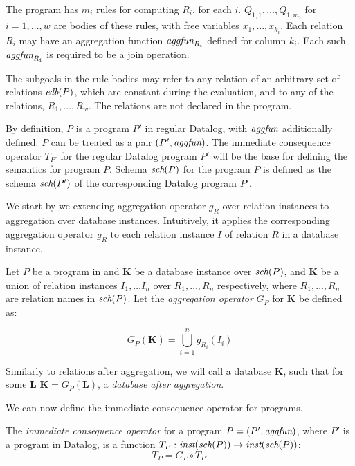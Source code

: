 The program has $m_i$ rules for computing $R_i$, for each $i$. $Q_{1, 1}, \dots, Q_{1, m_i}$ for $i = 1, \dots, w$ are bodies of these rules, with free variables $x_1, \dots, x_{k_i}$. Each relation $R_i$ may have an aggregation function $\textit{aggfun}_{R_i}$ defined for column $k_i$. Each such $\textit{aggfun}_{R_i}$ is required to be a join operation.

The subgoals in the rule bodies may refer to any relation of an arbitrary set of \edb relations $\textit{edb}(P)$, which are constant during the evaluation, and to any of the \idb relations, $R_1, \dots, R_w$. The \edb relations are not declared in the program.

By definition, $P$ is a program $P'$ in regular Datalog, with  $\textit{aggfun}$ additionally defined. $P$ can be treated as a pair $(P', \textit{aggfun})$. The immediate consequence operator $T_{P'}$ for the regular Datalog program $P'$ will be the base for defining the semantics for \datalogra program $P$. Schema $\textit{sch}(P)$ for the \datalogra program $P$ is defined as the schema $\textit{sch}(P')$ of the corresponding Datalog program $P'$.

We start by we extending aggregation operator $g_R$ over relation instances to aggregation over database instances. Intuitively, it applies the corresponding aggregation operator $g_R$ to each relation instance $I$ of relation $R$ in a database instance.

\begin{defn}
Let $P$ be a program in \datalogra and $\textbf{K}$ be a database instance over $\textit{sch}(P)$, and $\textbf{K}$ be a union of relation instances $I_1, \dots I_n$ over $R_1, \dots, R_n$ respectively, where $R_1, \dots, R_n$ are relation names in $\textit{sch}(P)$.
Let the \emph{aggregation operator} $G_P$ for $\textbf{K}$ be defined as:

$$G_P(\textbf{K}) = \bigcup_{i = 1}^n g_{R_i}(I_i)$$

\end{defn}
Similarly to relations after aggregation, we will call a database $\textbf{K}$, such that for some $\textbf{L}$ $\textbf{K} = G_P(\textbf{L})$, a \emph{database after aggregation}.

We can now define the immediate consequence operator for \datalogra programs.

\begin{defn}
The \emph{immediate consequence operator} for a \datalogra program $P = (P', \textit{aggfun})$, where $P'$ is a program in Datalog, is a function $T_P: \textit{inst}(\textit{sch}(P)) \to \textit{inst}(\textit{sch}(P))$:
$$T_P = G_P \circ T_{P'}$$
\end{defn}


